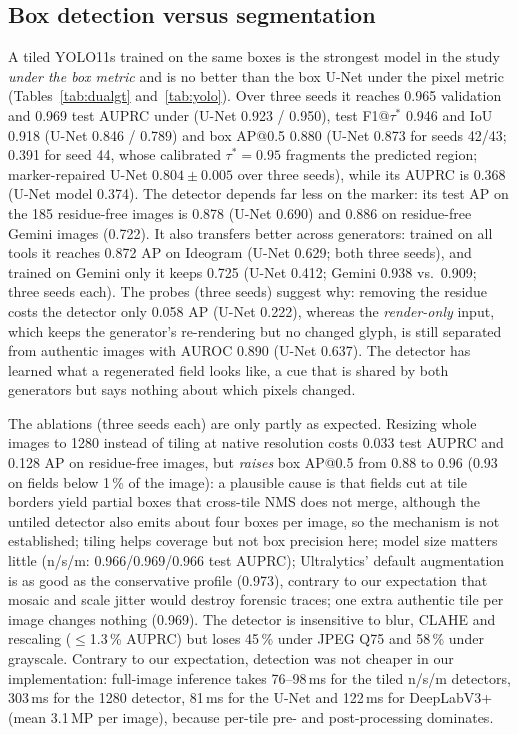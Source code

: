 \subsection{Box detection versus segmentation}
\label{sec:res-yolo}
A tiled YOLO11s trained on the same boxes is the strongest model in the study \emph{under the box metric} and is no better than the box U-Net under the pixel metric (Tables~\ref{tab:dualgt} and~\ref{tab:yolo}). Over three seeds it reaches 0.965 validation and 0.969 test AUPRC under \GTb{} (U-Net 0.923 / 0.950), test F1@$\tau^*$ 0.946 and IoU 0.918 (U-Net 0.846 / 0.789) and box AP@0.5 0.880 (U-Net 0.873 for seeds 42/43; 0.391 for seed 44, whose calibrated $\tau^*{=}0.95$ fragments the predicted region; marker-repaired U-Net $0.804{\pm}0.005$ over three seeds), while its \GTp{} AUPRC is 0.368 (U-Net \GTb{} model 0.374). The detector depends far less on the marker: its test AP on the 185 residue-free images is 0.878 (U-Net 0.690) and 0.886 on residue-free Gemini images (0.722). It also transfers better across generators: trained on all tools it reaches 0.872 AP on Ideogram (U-Net 0.629; both three seeds), and trained on Gemini only it keeps 0.725 (U-Net 0.412; Gemini 0.938 vs.\ 0.909; three seeds each). The probes (three seeds) suggest why: removing the residue costs the detector only 0.058 AP (U-Net 0.222), whereas the \emph{render-only} input, which keeps the generator's re-rendering but no changed glyph, is still separated from authentic images with AUROC 0.890 (U-Net 0.637). The detector has learned what a regenerated field looks like, a cue that is shared by both generators but says nothing about which pixels changed.

The ablations (three seeds each) are only partly as expected. Resizing whole images to 1280 instead of tiling at native resolution costs 0.033 test AUPRC and 0.128 AP on residue-free images, but \emph{raises} box AP@0.5 from 0.88 to 0.96 (0.93 on fields below 1\,\% of the image): a plausible cause is that fields cut at tile borders yield partial boxes that cross-tile NMS does not merge, although the untiled detector also emits about four boxes per image, so the mechanism is not established; tiling helps coverage but not box precision here; model size matters little (n/s/m: 0.966/0.969/0.966 test AUPRC); Ultralytics' default augmentation is as good as the conservative profile (0.973), contrary to our expectation that mosaic and scale jitter would destroy forensic traces; one extra authentic tile per image changes nothing (0.969). The detector is insensitive to blur, CLAHE and rescaling ($\le$1.3\,\% AUPRC) but loses 45\,\% under JPEG Q75 and 58\,\% under grayscale. Contrary to our expectation, detection was not cheaper in our implementation: full-image inference takes 76--98\,ms for the tiled n/s/m detectors, 303\,ms for the 1280 detector, 81\,ms for the U-Net and 122\,ms for DeepLabV3+ (mean 3.1\,MP per image), because per-tile pre- and post-processing dominates.

